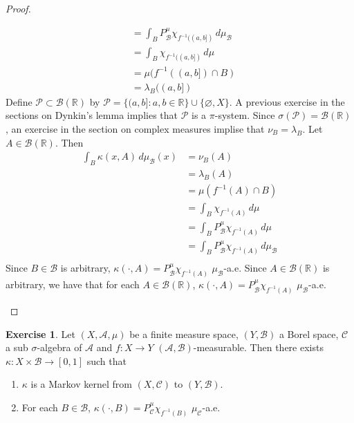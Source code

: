 \documentclass{book}
\theoremstyle{definition}
\newtheorem{ex}[definition]{Exercise}
\newcommand{\kap}{\kappa}
\newcommand{\lam}{\lambda}
\newcommand{\sig}{\sigma}
\newcommand{\R}{\mathbb{R}}
\newcommand{\MA}{\mathcal{A}}
\newcommand{\MB}{\mathcal{B}}
\newcommand{\MC}{\mathcal{C}}
\newcommand{\MP}{\mathcal{P}}
\DeclareMathOperator*{\0}{\mbf{0}}
\DeclareMathOperator*{\1}{\mbf{1}}
\newcommand{\dmu}{\, d \mu}
\begin{document}
\begin{proof}
\begin{enumerate}
\begin{align*}
				& = \int_{B} P^{\mu}_{\MB}\chi_{f^{-1}((a, b])} \dmu_{\MB} \\
				& = \int_{B} \chi_{f^{-1}((a, b])} \dmu  \\
				& = \mu(f^{-1}((a, b]) \cap B) \\
				& = \lam_{B}((a,b])
			\end{align*}
			Define $\MP \subset \MB(\R)$ by $\MP = \{(a,b]: a,b \in \R\} \cup \{\varnothing, X\}$. A previous exercise in the sections on Dynkin's lemma implies that $\MP$ is a $\pi$-system. Since $\sig(\MP) = \MB(\R)$, an exercise in the section on complex measures implise that $\nu_{B} = \lam_{B}$. Let $A \in \MB(\R)$. Then 
			\begin{align*}
				\int_B \kap(x, A) \dmu_{\MB}(x) 
				& = \nu_B(A) \\
				& = \lam_{B}(A) \\
				& =  \mu(f^{-1}(A) \cap B) \\
				& = \int_B \chi_{f^{-1}(A)} \dmu \\
				& = \int_B P^{\mu}_{\MB} \chi_{f^{-1}(A)} \dmu \\
				& = \int_B P^{\mu}_{\MB} \chi_{f^{-1}(A)} \dmu_{\MB} \\
			\end{align*}
			Since $B \in \MB$ is arbitrary, $\kap(\cdot, A) = P^{\mu}_{\MB} \chi_{f^{-1}(A)}$ $\mu_{\MB}$-a.e. Since $A \in \MB(\R)$ is arbitrary, we have that for each $A \in \MB(\R)$, $\kap(\cdot, A) = P^{\mu}_{\MB} \chi_{f^{-1}(A)}$ $\mu_{\MB}$-a.e.
		\end{enumerate}
	\end{proof}

	\begin{ex}
			Let $(X, \MA, \mu)$ be a finite measure space, $(Y, \MB)$ a Borel space, $\MC$ a sub $\sig$-algebra of $\MA$ and $f: X \rightarrow Y$ $(\MA, \MB)$-measurable. Then there exists $\kap: X \times \MB \rightarrow [0,1]$ such that 
		\begin{enumerate}
			\item $\kap$ is a Markov kernel from $(X, \MC)$ to $(Y, \MB)$.
			\item For each $B \in \MB$, $\kap(\cdot, B) = P^{\mu}_{\MC}\chi_{f^{-1}(B)}$ $\mu_{\MC}$-a.e.
		\end{enumerate}
	\end{ex}
\end{document}
